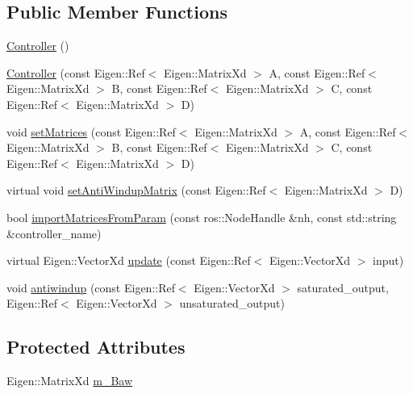 \subsection*{Public Member Functions}
\begin{DoxyCompactItemize}
\item 
\hyperlink{classeigen__control__toolbox_1_1_controller_a5e1e2668aa9f0e16940e37e812f90a59}{Controller} ()
\item 
\hyperlink{classeigen__control__toolbox_1_1_controller_a5d0cafdfca0fb15b7ba2a1d343f897ac}{Controller} (const Eigen\+::\+Ref$<$ Eigen\+::\+Matrix\+Xd $>$ A, const Eigen\+::\+Ref$<$ Eigen\+::\+Matrix\+Xd $>$ B, const Eigen\+::\+Ref$<$ Eigen\+::\+Matrix\+Xd $>$ C, const Eigen\+::\+Ref$<$ Eigen\+::\+Matrix\+Xd $>$ D)
\item 
void \hyperlink{classeigen__control__toolbox_1_1_controller_abcf2a726f7b30f9638ec4c263a94849e}{set\+Matrices} (const Eigen\+::\+Ref$<$ Eigen\+::\+Matrix\+Xd $>$ A, const Eigen\+::\+Ref$<$ Eigen\+::\+Matrix\+Xd $>$ B, const Eigen\+::\+Ref$<$ Eigen\+::\+Matrix\+Xd $>$ C, const Eigen\+::\+Ref$<$ Eigen\+::\+Matrix\+Xd $>$ D)
\item 
virtual void \hyperlink{classeigen__control__toolbox_1_1_controller_a63728f95d5d4ab2984f3deb402e23c1f}{set\+Anti\+Windup\+Matrix} (const Eigen\+::\+Ref$<$ Eigen\+::\+Matrix\+Xd $>$ D)
\item 
bool \hyperlink{classeigen__control__toolbox_1_1_controller_a8e4ba86e84ed04596442811d99a2cd1d}{import\+Matrices\+From\+Param} (const ros\+::\+Node\+Handle \&nh, const std\+::string \&controller\+\_\+name)
\item 
virtual Eigen\+::\+Vector\+Xd \hyperlink{classeigen__control__toolbox_1_1_controller_a1091bd414788093e7af2fb89f291266a}{update} (const Eigen\+::\+Ref$<$ Eigen\+::\+Vector\+Xd $>$ input)
\item 
void \hyperlink{classeigen__control__toolbox_1_1_controller_a42c4e78a4a1b012daeaacd437e2d728e}{antiwindup} (const Eigen\+::\+Ref$<$ Eigen\+::\+Vector\+Xd $>$ saturated\+\_\+output, Eigen\+::\+Ref$<$ Eigen\+::\+Vector\+Xd $>$ unsaturated\+\_\+output)
\end{DoxyCompactItemize}
\subsection*{Protected Attributes}
\begin{DoxyCompactItemize}
\item 
Eigen\+::\+Matrix\+Xd \hyperlink{classeigen__control__toolbox_1_1_controller_a02cc421090f12505dd3f7025ff2dd134}{m\+\_\+\+Baw}
\end{DoxyCompactItemize}
